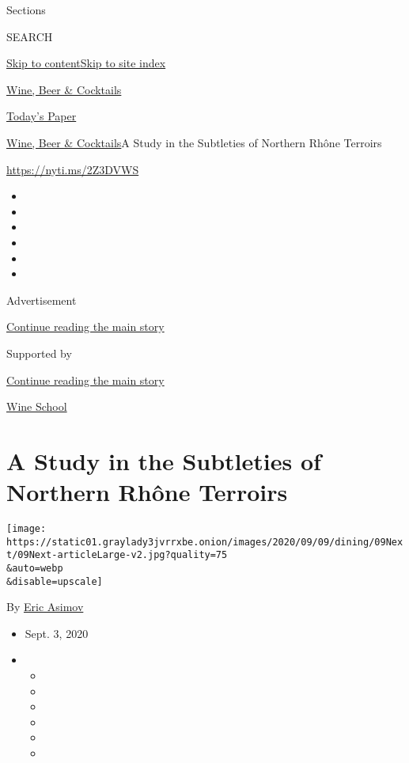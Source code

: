Sections

SEARCH

\protect\hyperlink{site-content}{Skip to
content}\protect\hyperlink{site-index}{Skip to site index}

\href{https://www.nytimes3xbfgragh.onion/section/food/drinks}{Wine, Beer
\& Cocktails}

\href{https://myaccount.nytimes3xbfgragh.onion/auth/login?response_type=cookie\&client_id=vi}{}

\href{https://www.nytimes3xbfgragh.onion/section/todayspaper}{Today's
Paper}

\href{/section/food/drinks}{Wine, Beer \& Cocktails}\textbar{}A Study in
the Subtleties of Northern Rhône Terroirs

\url{https://nyti.ms/2Z3DVWS}

\begin{itemize}
\item
\item
\item
\item
\item
\item
\end{itemize}

Advertisement

\protect\hyperlink{after-top}{Continue reading the main story}

Supported by

\protect\hyperlink{after-sponsor}{Continue reading the main story}

\href{/column/wine-school}{Wine School}

\hypertarget{a-study-in-the-subtleties-of-northern-rhuxf4ne-terroirs}{%
\section{A Study in the Subtleties of Northern Rhône
Terroirs}\label{a-study-in-the-subtleties-of-northern-rhuxf4ne-terroirs}}

\texttt{[image: https://static01.graylady3jvrrxbe.onion/images/2020/09/09/dining/09Next/09Next-articleLarge-v2.jpg?quality=75\\\&auto=webp\\\&disable=upscale]}

By \href{https://www.nytimes3xbfgragh.onion/by/eric-asimov}{Eric Asimov}

\begin{itemize}
\item
  Sept. 3, 2020
\item
  \begin{itemize}
  \item
  \item
  \item
  \item
  \item
  \item
  \end{itemize}
\end{itemize}

